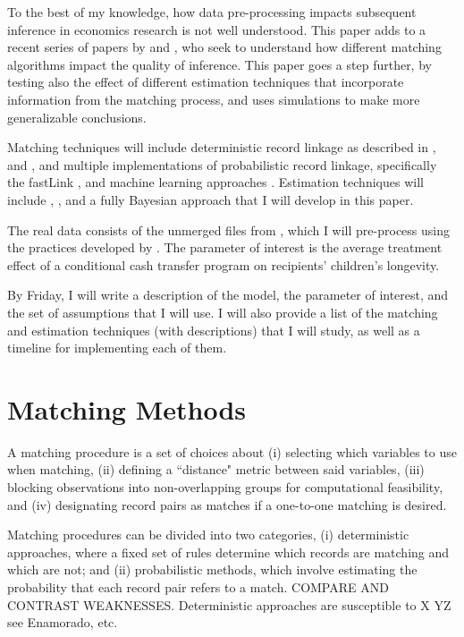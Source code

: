 \documentclass[12pt]{article}
\begin{document}
To the best of my knowledge, how data pre-processing impacts subsequent inference in economics research is not well understood.  This paper adds to a recent series of papers by \cite{arp2018} and \cite{abe2019}, who seek to understand how different matching algorithms impact the quality of inference.  This paper goes a step further, by testing also the effect of different estimation techniques that incorporate information from the matching process, and uses simulations to make more generalizable conclusions.  

Matching techniques will include deterministic record linkage as described in \cite{ferrie}, and \cite{arp2018}, and multiple implementations of probabilistic record linkage, specifically the fastLink \cite{enamorado2019}, and machine learning approaches \cite{Feigenbaum2016AML}. Estimation techniques will include \cite{ahl2019}, \cite{lahiri05}, and a fully Bayesian approach that I will develop in this paper. 

The real data consists of the unmerged files from \cite{aizer2016}, which I will pre-process using the practices developed by \cite{arp2018}.  The parameter of interest is the average treatment effect of a conditional cash transfer program on recipients' children's longevity.   

By Friday, I will write a description of the model, the parameter of interest, and the set of assumptions that I will use.   I will also provide a list of the matching and estimation techniques (with descriptions) that I will study, as well as a timeline for implementing each of them. 
 

\newpage
\section{Matching Methods}

A matching procedure is a set of choices about (i) selecting which variables to use when matching, (ii) defining a ``distance" metric between said variables, (iii) blocking observations into non-overlapping groups for computational feasibility, and (iv) designating record pairs as matches if a one-to-one matching is desired.    

Matching procedures can be divided into two categories, (i) deterministic approaches, where a fixed set of rules determine which records are matching and which are not; and (ii) probabilistic methods, which involve estimating the probability that each record pair refers to a match.  COMPARE AND CONTRAST WEAKNESSES.  Deterministic approaches are susceptible to X YZ  see Enamorado, etc. 
\end{document}
